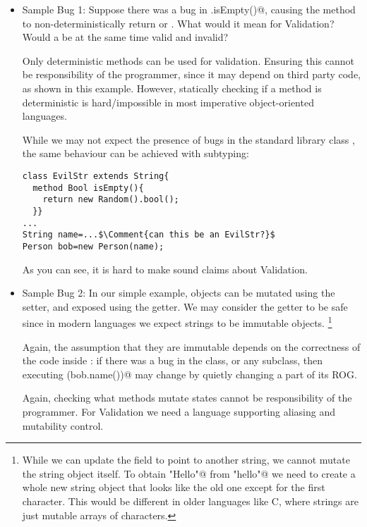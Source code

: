 \begin{itemize}
\item Sample Bug 1:
Suppose there was a bug in \Q@String.isEmpty()@, causing the method to non-deterministically return \Q@true@ or \Q@false@.
What would it mean for Validation?
Would a \Q@Person@ be at the same time 
valid and invalid?

Only deterministic methods can be used for validation.
Ensuring this cannot be responsibility of the \Q@Person@ programmer, since it may depend on third party code, as shown in this example.
However, statically checking if a method is deterministic is hard/impossible in most imperative object-oriented languages.

While we may not expect the presence of bugs in the standard library class \Q@String@, the same behaviour can be achieved with subtyping:
\saveSpace
\begin{lstlisting}
class EvilStr extends String{
  method Bool isEmpty(){
    return new Random().bool();
  }}
...
String name=...$\Comment{can this be an EvilStr?}$
Person bob=new Person(name);
\end{lstlisting}
\saveSpace
As you can see, it is hard to make sound claims about Validation.


\item Sample Bug 2:
In our simple example, \Q@Person@ objects can be mutated using the setter, and exposed using the getter.
We may consider the getter to be safe since in modern languages we expect strings to be immutable objects.
\footnote{While we can update the field \Q@name@ to point to another string, we cannot mutate the string object itself.
To obtain  \Q@"Hello"@ from \Q@"hello"@ we need to create a whole new string object that looks like the old one except for the first character. This would be different in older languages like C, where strings are just mutable arrays of characters.}

Again, the assumption that they are immutable depends on the correctness of the code inside \Q@String@: if there was a bug in the \Q@String@ class, or any \Q@String@ subclass, then executing 
\Q@println(bob.name())@ may change \Q@bob@ by quietly changing a part of its ROG.

Again, checking
what methods mutate states cannot be responsibility of the \Q@Person@ programmer.
For Validation we need a language supporting aliasing and mutability control.



\end{itemize}
